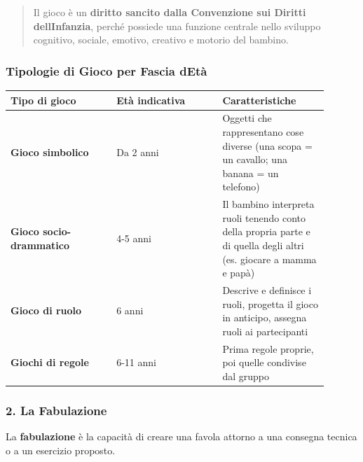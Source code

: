 \documentclass[a4paper,11pt]{article}
\begin{document}
\begin{quote}
      Il gioco è un \textbf{diritto sancito dalla Convenzione sui Diritti
            dell\textquotesingle Infanzia}, perché possiede una funzione centrale
      nello sviluppo cognitivo, sociale, emotivo, creativo e motorio del
      bambino.
\end{quote}

\subsubsection{Tipologie di Gioco per Fascia
      d\textquotesingle Età}\label{tipologie-di-gioco-per-fascia-detuxe0}

\begin{longtable}[]{@{}p{0.30\linewidth}p{0.30\linewidth}p{0.30\linewidth}@{}}
      \toprule\noalign{}
      Tipo di gioco                   & Età indicativa & Caratteristiche                  \\
      \midrule\noalign{}
      \endhead
      \bottomrule\noalign{}
      \endlastfoot
      \textbf{Gioco simbolico}        & Da 2 anni      & Oggetti che rappresentano cose
      diverse (una scopa = un cavallo; una banana = un telefono)                          \\
      \textbf{Gioco socio-drammatico} & 4-5 anni       & Il bambino interpreta ruoli
      tenendo conto della propria parte e di quella degli altri (es. giocare a
      mamma e papà)                                                                       \\
      \textbf{Gioco di ruolo}         & 6 anni         & Descrive e definisce i ruoli,
      progetta il gioco in anticipo, assegna ruoli ai partecipanti                        \\
      \textbf{Giochi di regole}       & 6-11 anni      & Prima regole proprie, poi quelle
      condivise dal gruppo                                                                \\
\end{longtable}

\subsubsection{2. La Fabulazione}\label{la-fabulazione}

La \textbf{fabulazione} è la capacità di creare una favola attorno a una
consegna tecnica o a un esercizio proposto.
\end{document}
